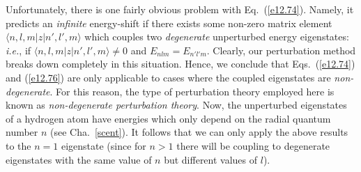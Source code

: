 Unfortunately, there is one fairly obvious problem with Eq.~(\ref{e12.74}). Namely,  it predicts  an {\em infinite}\/ energy-shift if there exists some non-zero
matrix element $\langle n,l,m|z|n',l',m\rangle$ which couples
two {\em degenerate}\/ unperturbed energy eigenstates: {\em i.e.},
if $\langle n,l,m|z|n',l',m\rangle\neq 0$ and $E_{nlm}=E_{n'l'm}$.
Clearly,  our perturbation method breaks down completely in this
situation. Hence, we conclude that Eqs.~(\ref{e12.74}) and (\ref{e12.76})
are only applicable to cases where the coupled eigenstates are
{\em non-degenerate}. For this reason, the type of perturbation
theory employed here is known as {\em non-degenerate perturbation theory}.
Now, the unperturbed eigenstates of a hydrogen atom have energies which
only depend on the radial quantum number $n$ (see Cha.~\ref{scent}). It follows that
we can only apply the above results to the $n=1$ eigenstate (since
for $n>1$ there will be coupling to degenerate eigenstates with
the same value of $n$ but different values of $l$).  


